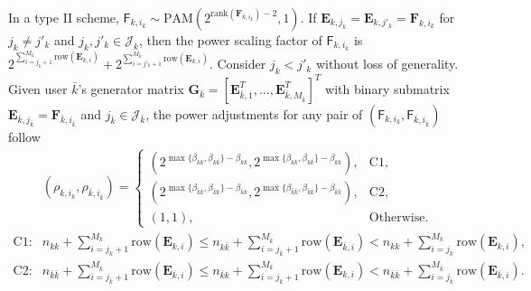 \documentclass[12pt, draftclsnofoot, onecolumn]{IEEEtran}
\newcommand{\msf}[1]{\mathsf{#1}}
\theoremstyle{definition}
\begin{document}
In a type II scheme, $\msf{F}_{k,i_k}\sim \text{PAM}(2^{\text{rank}(\boldsymbol{F}_{k,i_k})-2},1)$. If $\boldsymbol{E}_{k,j_k}=\boldsymbol{E}_{k,j'_k}=\boldsymbol{F}_{k,i_k}$ for $j_k \neq j'_k$ and $j_k,j'_k \in \mathcal{J}_k$, then the power scaling factor of $\msf{F}_{k,i_k}$ is $2^{\sum_{i=j_k+1}^{M_k}\text{row}(\boldsymbol{E}_{k,i})}+2^{\sum_{i=j'_k+1}^{M_k}\text{row}(\boldsymbol{E}_{k,i})}$. %
Consider $j_k<j'_k$ without loss of generality. Given user $\bar{k}$'s generator matrix $\boldsymbol{G}_{\bar{k}} = [\boldsymbol{E}^T_{\bar{k},1},\ldots,\boldsymbol{E}^T_{\bar{k},M_{\bar{k}}}]^T$ with binary submatrix $\boldsymbol{E}_{\bar{k},j_{\bar{k}}} = \boldsymbol{F}_{\bar{k},i_{\bar{k}}}$ and $j_{\bar{k}}\in \mathcal{J}_{\bar{k}}$, the power adjustments for any pair of $(\msf{F}_{k,i_k},\msf{F}_{\bar{k},i_{\bar{k}}})$ follow
\begin{align}\label{eq:rho}
&(\rho_{k,i_k},\rho_{\bar{k},i_{\bar{k}}}) =\left\{\begin{array}{ll} (2^{\max\{\beta_{kk},\beta_{k\bar{k}} \}-\beta_{kk}},2^{\max\{\beta_{kk},\beta_{k\bar{k}} \}-\beta_{kk}}),& \text{C1} ,\\
(2^{\max\{\beta_{\bar{k}\bar{k}},\beta_{\bar{k}k} \}-\beta_{\bar{k}k}},2^{\max\{\beta_{\bar{k}\bar{k}},\beta_{\bar{k}k} \}-\beta_{\bar{k}\bar{k}}}), &\text{C2},\\
(1,1), & \text{Otherwise}.
\end{array}\right.\\
\text{C1}:&n_{kk}+\sum\nolimits_{i=j_k+1}^{M_k}\text{row}(\boldsymbol{E}_{k,i}) \leq n_{k\bar{k}}+\sum\nolimits_{i=j_{\bar{k}}+1}^{M_{\bar{k}}}\text{row}(\boldsymbol{E}_{\bar{k},i}) < n_{kk}+\sum\nolimits_{i=j_k}^{M_k}\text{row}(\boldsymbol{E}_{k,i}), \nonumber\\
\text{C2}:&n_{\bar{k}\bar{k}}+\sum\nolimits_{i=j_{\bar{k}}+1}^{M_{\bar{k}}}\text{row}(\boldsymbol{E}_{{\bar{k}},i})
\leq n_{\bar{k}k}+\sum\nolimits_{i=j_k+1}^{M_k}\text{row}(\boldsymbol{E}_{k,i})< n_{\bar{k}\bar{k}}+\sum\nolimits_{i=j_{\bar{k}}}^{M_{\bar{k}}}\text{row}(\boldsymbol{E}_{{\bar{k}},i}). \nonumber
\end{align}
\end{document}
